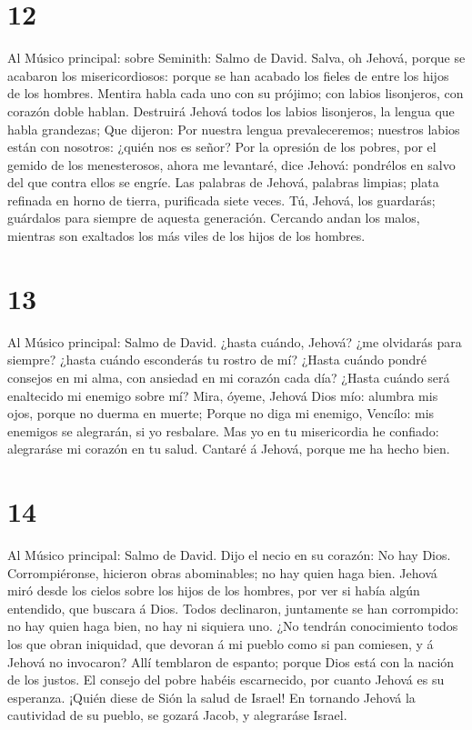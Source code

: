 \hypertarget{section-11}{%
\section{12}\label{section-11}}

 Al Músico principal: sobre Seminith: Salmo de David.
Salva, oh Jehová, porque se acabaron los misericordiosos: porque se han
acabado los fieles de entre los hijos de los hombres. 
Mentira habla cada uno con su prójimo; con labios lisonjeros, con
corazón doble hablan.  Destruirá Jehová todos los labios
lisonjeros, la lengua que habla grandezas;  Que dijeron:
Por nuestra lengua prevaleceremos; nuestros labios están con nosotros:
¿quién nos es señor?  Por la opresión de los pobres, por
el gemido de los menesterosos, ahora me levantaré, dice Jehová:
pondrélos en salvo del que contra ellos se engríe.  Las
palabras de Jehová, palabras limpias; plata refinada en horno de tierra,
purificada siete veces.  Tú, Jehová, los guardarás;
guárdalos para siempre de aquesta generación.  Cercando
andan los malos, mientras son exaltados los más viles de los hijos de
los hombres.

\hypertarget{section-12}{%
\section{13}\label{section-12}}

 Al Músico principal: Salmo de David. ¿hasta cuándo,
Jehová? ¿me olvidarás para siempre? ¿hasta cuándo esconderás tu rostro
de mí?  ¿Hasta cuándo pondré consejos en mi alma, con
ansiedad en mi corazón cada día? ¿Hasta cuándo será enaltecido mi
enemigo sobre mí?  Mira, óyeme, Jehová Dios mío: alumbra
mis ojos, porque no duerma en muerte;  Porque no diga mi
enemigo, Vencílo: mis enemigos se alegrarán, si yo resbalare.
 Mas yo en tu misericordia he confiado: alegraráse mi
corazón en tu salud.  Cantaré á Jehová, porque me ha hecho
bien.

\hypertarget{section-13}{%
\section{14}\label{section-13}}

 Al Músico principal: Salmo de David. Dijo el necio en su
corazón: No hay Dios. Corrompiéronse, hicieron obras abominables; no hay
quien haga bien.  Jehová miró desde los cielos sobre los
hijos de los hombres, por ver si había algún entendido, que buscara á
Dios.  Todos declinaron, juntamente se han corrompido: no
hay quien haga bien, no hay ni siquiera uno.  ¿No tendrán
conocimiento todos los que obran iniquidad, que devoran á mi pueblo como
si pan comiesen, y á Jehová no invocaron?  Allí temblaron
de espanto; porque Dios está con la nación de los justos. 
El consejo del pobre habéis escarnecido, por cuanto Jehová es su
esperanza.  ¡Quién diese de Sión la salud de Israel! En
tornando Jehová la cautividad de su pueblo, se gozará Jacob, y
alegraráse Israel.

